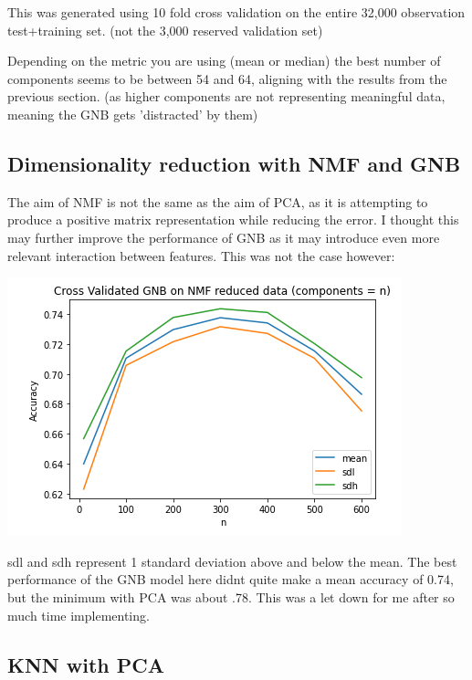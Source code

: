 \documentclass[11pt]{article}
\begin{document}
This was generated using 10 fold cross validation on the entire 32,000 observation test+training set. (not the 3,000 reserved validation set)

Depending on the metric you are using (mean or median) the best number of components seems to be between 54 and 64, aligning with the results from the previous section. (as higher components are not representing meaningful data, meaning the GNB gets 'distracted' by them)

\subsection{Dimensionality reduction with NMF and GNB}
\label{sec:org3b2030f}
The aim of NMF is not the same as the aim of PCA, as it is attempting to produce a positive matrix representation while reducing the error. I thought this may further improve the performance of GNB as it may introduce even more relevant interaction between features. This was not the case however:
\begin{center}
\includegraphics[width=.9\linewidth]{.images/Experimentation_and_Results/2020-10-21_21-07-43_screenshot.png}
\end{center}

sdl and sdh represent 1 standard deviation above and below the mean. The best performance of the GNB model here didnt quite make a mean accuracy of 0.74, but the minimum with PCA was about .78. This was a let down for me after so much time implementing.

\subsection{KNN with PCA}
\label{sec:org0fe5fa6}
\end{document}
